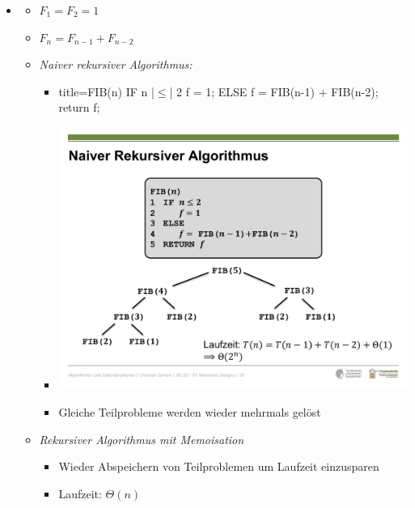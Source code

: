 \documentclass[
    12pt,
    a4paper,
    ngerman,
    color=3b,%
    marginpar=false,
    colorback=false,
    leqno,
]{tudaexercise}
\begin{document}
\begin{itemize}
        \item {}
            \begin{itemize}
                \item $F_1 = F_2 = 1$
                \item $F_n = F_{n-1} + F_{n-2}$
                \item \textit{Naiver rekursiver Algorithmus:}
                    \begin{itemize}
                        \item[]
                            \begin{ccode}[autogobble,escapeinside=||]{title={FIB(n)}}
                            IF n |$\leq$| 2
                                f = 1;
                            ELSE
                                f = FIB(n-1) + FIB(n-2);
                            return f;
                            \end{ccode}
                            \item[] \includegraphics[width=13cm]{pictures/fibBaum.pdf}
                            \item[] Gleiche Teilprobleme werden wieder mehrmals gelöst  
                    \end{itemize}
\pagebreak
                \item \textit{Rekursiver Algorithmus mit Memoisation}
                    \begin{itemize}
                        \item Wieder Abspeichern von Teilproblemen um Laufzeit einzusparen
                        \item Laufzeit: $\Theta(n)$

\end{itemize}
\end{itemize}
\end{itemize}
\end{document}
